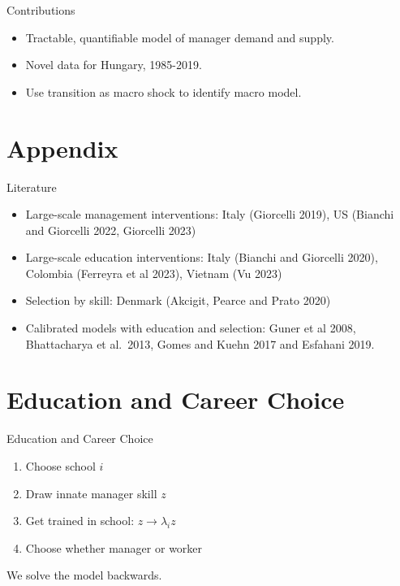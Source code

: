 \documentclass[
  ignorenonframetext,
  aspectratio=1610,
]{beamer}
\providecommand{\tightlist}{%
  \setlength{\itemsep}{0pt}\setlength{\parskip}{0pt}}
\let\oldsection\section
\renewcommand{\section}{
  \addtocounter{framenumber}{-1} %
  \oldsection
}
\begin{document}
\begin{frame}{Contributions}
\protect\hypertarget{contributions}{}
\begin{itemize}
\tightlist
\item
  Tractable, quantifiable model of manager demand and supply.
\item
  Novel data for Hungary, 1985-2019.
\item
  Use transition as macro shock to identify macro model.
\end{itemize}
\end{frame}

\section{Appendix}\label{appendix}

\begin{frame}{Literature}
\protect\hypertarget{literature}{}
\begin{itemize}
\tightlist
\item
  Large-scale management interventions: Italy (Giorcelli 2019), US
  (Bianchi and Giorcelli 2022, Giorcelli 2023)
\item
  Large-scale education interventions: Italy (Bianchi and Giorcelli
  2020), Colombia (Ferreyra et al 2023), Vietnam (Vu 2023)
\item
  Selection by skill: Denmark (Akcigit, Pearce and Prato 2020)
\item
  Calibrated models with education and selection: Guner et al 2008,
  Bhattacharya et al.~2013, Gomes and Kuehn 2017 and Esfahani 2019.
\end{itemize}
\end{frame}

\section{Education and Career
Choice}\label{education-and-career-choice-1}

\begin{frame}{Education and Career Choice}
\protect\hypertarget{education-and-career-choice-2}{}
\begin{enumerate}
\tightlist
\item
  Choose school \(i\)
\item
  Draw innate manager skill \(z\)
\item
  Get trained in school: \(z\to\lambda_i z\)
\item
  Choose whether manager or worker
\end{enumerate}

We solve the model backwards.
\end{frame}
\end{document}
